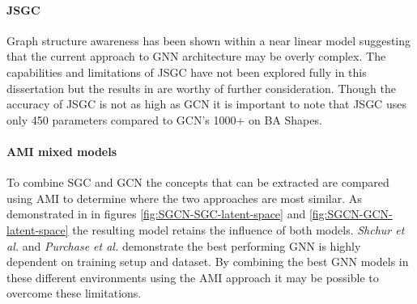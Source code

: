 \paragraph{JSGC}
Graph structure awareness has been shown within a near linear model suggesting that the current approach to GNN architecture may be overly complex.
The capabilities and limitations of JSGC have not been explored fully in this dissertation but the results in  are worthy of further consideration.
Though the accuracy of JSGC is not as high as GCN it is important to note that JSGC uses only 450 parameters compared to GCN's 1000+ on BA Shapes.

\paragraph{AMI mixed models}
To combine SGC and GCN the concepts that can be extracted are compared using AMI to determine where the two approaches are most similar.
As demonstrated in  in figures \ref{fig:SGCN-SGC-latent-space} and \ref{fig:SGCN-GCN-latent-space} the resulting model retains the influence of both models.
\textit{Shchur et al.}\cite{shchur2018pitfalls} and \textit{Purchase et al.}\cite{purchase2022revisiting} demonstrate the best performing GNN is highly dependent on training setup and dataset.
By combining the best GNN models in these different environments using the AMI approach it may be possible to overcome these limitations.

